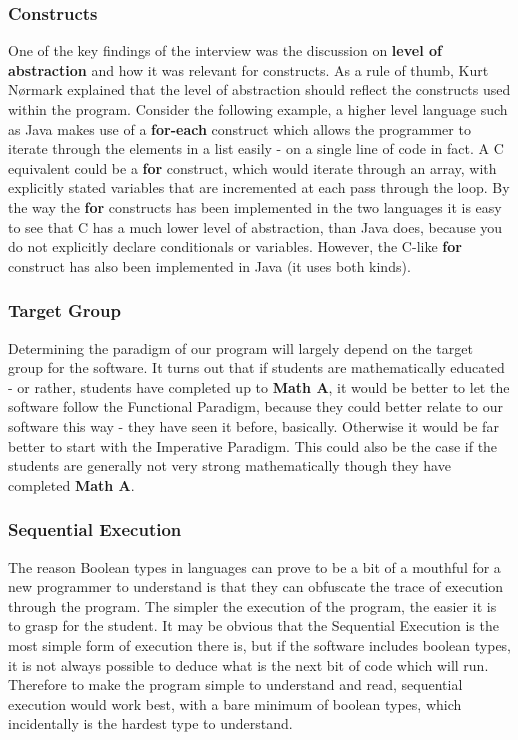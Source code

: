 \subsubsection{Constructs}

One of the key findings of the interview was the discussion on \textbf{level of abstraction} and how it was relevant for constructs. As a rule of 
thumb, Kurt N{\o}rmark explained that the level of abstraction should reflect the constructs used within the program. Consider the following example, a 
higher level language such as Java makes use of a \textbf{for-each} construct which allows the programmer to iterate through the elements in a list 
easily - on a single line of code in fact. A C equivalent could be a \textbf{for} construct, which would iterate through an array, with explicitly 
stated variables that are incremented at each pass through the loop. By the way the \textbf{for} constructs has been implemented in the two languages 
it is easy to see that C has a much lower level of abstraction, than Java does, because you do not explicitly declare conditionals or variables. 
However, the C-like \textbf{for} construct has also been implemented in Java (it uses both kinds). 

\subsubsection{Target Group}

Determining the paradigm of our program will largely depend on the target group for the software. It turns out that if students are mathematically 
educated - or rather, students have completed up to \textbf{Math A}, it would be better to let the software follow the Functional Paradigm, because 
they could better relate to our software this way - they have seen it before, basically. Otherwise it would be far better to start with the Imperative 
Paradigm. This could also be the case if the students are generally not very strong mathematically though they have completed \textbf{Math A}.

\subsubsection{Sequential Execution}

The reason Boolean types in languages can prove to be a bit of a mouthful for a new programmer to understand is that they can obfuscate the trace of 
execution through the program. The simpler the execution of the program, the easier it is to grasp for the student. It may be obvious that the 
Sequential Execution is the most simple form of execution there is, but if the software includes boolean types, it is not always possible to deduce 
what is the next bit of code which will run. Therefore to make the program simple to understand and read, sequential execution would work best, with a 
bare minimum of boolean types, which incidentally is the hardest type to understand.

